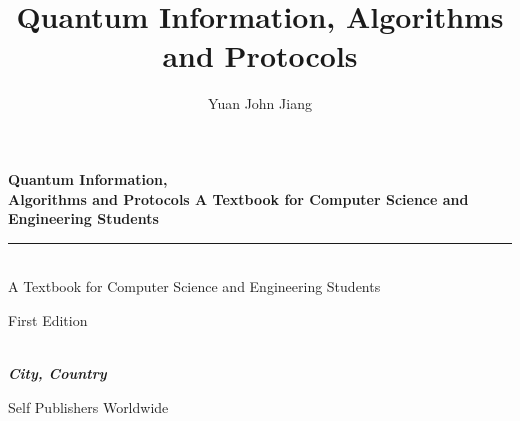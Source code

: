 \documentclass{book}
\title{Quantum Information, Algorithms and Protocols}
\author{Yuan John Jiang}
\makeatletter
\newcommand{\booksubtitle}{A Textbook for Computer Science and Engineering Students}
\newcommand{\authorsubtitle}{City, Country}
\newcommand{\booktitle}{\@title}
\newcommand{\bookauthor}{\@author}
\makeatother
\begin{document}
\frontmatter



\begin{titlepage}
\begin{flushleft}

\textbf{\fontsize{38}{50}\selectfont \booktitle Quantum Information,\\Algorithms and Protocols \booksubtitle}

\par\noindent\rule{\textwidth}{2pt}\\
\booksubtitle


\begin{flushright}
\Large First Edition
\end{flushright}

\vspace{\fill}

\textbf{\large \bookauthor}\\[3.5pt]
\textbf{\large \textit{\authorsubtitle}}

\vspace{\fill}

\begin{center}
\small{Self Publishers Worldwide\\
}
\end{center}

\end{flushleft}
\end{titlepage}
\restoregeometry

\thispagestyle{empty}
\end{document}
